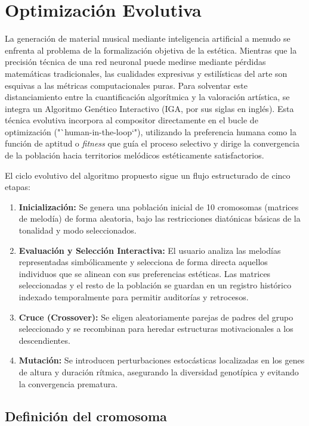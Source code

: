 \section{Optimización Evolutiva}

La generación de material musical mediante inteligencia artificial a menudo se enfrenta al problema de la formalización objetiva de la estética. Mientras que la precisión técnica de una red neuronal puede medirse mediante pérdidas matemáticas tradicionales, las cualidades expresivas y estilísticas del arte son esquivas a las métricas computacionales puras. Para solventar este distanciamiento entre la cuantificación algorítmica y la valoración artística, se integra un Algoritmo Genético Interactivo (IGA, por sus siglas en inglés). Esta técnica evolutiva incorpora al compositor directamente en el bucle de optimización ("`human-in-the-loop`"), utilizando la preferencia humana como la función de aptitud o \textit{fitness} que guía el proceso selectivo y dirige la convergencia de la población hacia territorios melódicos estéticamente satisfactorios.

El ciclo evolutivo del algoritmo propuesto sigue un flujo estructurado de cinco etapas:
\begin{enumerate}
    \item \textbf{Inicialización:} Se genera una población inicial de 10 cromosomas (matrices de melodía) de forma aleatoria, bajo las restricciones diatónicas básicas de la tonalidad y modo seleccionados.
    \item \textbf{Evaluación y Selección Interactiva:} El usuario analiza las melodías representadas simbólicamente y selecciona de forma directa aquellos individuos que se alinean con sus preferencias estéticas.
     Las matrices seleccionadas y el resto de la población se guardan en un registro histórico indexado temporalmente para permitir auditorías y retrocesos.
    \item \textbf{Cruce (Crossover):} Se eligen aleatoriamente parejas de padres del grupo seleccionado y se recombinan para heredar estructuras motivacionales a los descendientes.
    \item \textbf{Mutación:} Se introducen perturbaciones estocásticas localizadas en los genes de altura y duración rítmica, asegurando la diversidad genotípica y evitando la convergencia prematura.
\end{enumerate}

\subsection{Definición del cromosoma}

